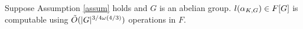 %
%
%
%

\begin{proposition}
Suppose Assumption \ref{assum} holds and $G$ is an abelian group. $l(\alpha_{K,G}) \in F[G]$ is computable using $\tilde{O}(\vert G \vert ^{3/4 \omega(4/3)})$ 
operations in $F$.
\end{proposition}

